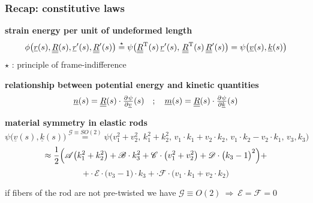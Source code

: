 \begin{frame}
  \frametitle{Recap: constitutive laws}
  
  \textbf{strain energy per unit of undeformed length}
  \begin{displaymath}
    \phi \bigl( \underline{r}(s),\underline{\underline{R}}(s),\underline{r}^{\prime}(s),\underline{\underline{R}}^{\prime}(s) \bigr) \overset{\star}{=}
    \psi \bigl(
      \underline{\underline{R}}^{\mathrm{T}}(s) \, \underline{r}^{\prime}(s) , \,
      \underline{\underline{R}}^{\mathrm{T}}(s) \, \underline{\underline{R}}^{\prime}(s)
    \bigr) =
    \psi \bigl(
      \underline{v}(s) , \underline{k}(s)
    \bigr)
  \end{displaymath}
  $\star$ : principle of frame-indifference
  
  \vspace{0.8em}
  \textbf{relationship between potential energy and kinetic quantities}
  \begin{displaymath}
    \underline{n}(s) = \doubleunderline{R}(s) \cdot \pd{\psi}{\underline{v}}(s) %
  \quad ; \quad
    \underline{m}(s) = \doubleunderline{R}(s) \cdot \pd{\psi}{\underline{k}}(s) %
  \end{displaymath}
  
  \vspace{0.8em}
  \textbf{material symmetry in elastic rods}
  \begin{displaymath}
    \psi \bigl(
      \underline{v}(s) , \underline{k}(s)
    \bigr) \overset{\mathscr{G} \equiv SO(2)}{=}
    \psi \bigl(
      v_1^2 + v_2^2 , \, k_1^2 + k_2^2 , \, v_1 \cdot k_1 + v_2 \cdot k_2 , \, v_1 \cdot k_2 - v_2 \cdot k_1 , \, v_3 , k_3
    \bigr)
  \end{displaymath}
  \begin{displaymath}
    \approx \frac{1}{2} \Bigl(
      \mathscr{A} \bigl( k_1^2 + k_2^2 \bigr) +
      \mathscr{B} \cdot k_3^2 +
      \mathscr{C} \cdot \bigl( v_1^2 + v_2^2 \bigr) +
      \mathscr{D} \cdot \bigl( k_3 - 1 \bigr)^2 \Bigr) +
  \end{displaymath}
  \begin{displaymath}
    + \cdot \mathscr{E} \cdot \bigl( v_3 - 1 \bigr) \cdot k_3 +
      \cdot \mathscr{F} \cdot \bigl( v_1 \cdot k_1 + v_2 \cdot k_2 \bigr)
  \end{displaymath}
  
  if fibers of the rod are not pre-twisted we have $\mathscr{G} \equiv O(2) \: \Rightarrow \: \mathscr{E} = \mathscr{F} = 0$
\end{frame}


